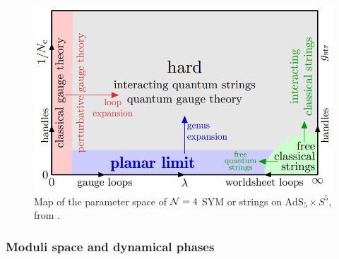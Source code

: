             \begin{figure}[H]
                \centering
                \includegraphics[scale=0.4]{Pictures/N4SYMparameterspace.png}
                \caption{Map of the parameter space of $\mathcal{N}=4$ SYM or strings on $\text{AdS}_5\times S^5$, from \cite{Beisert_2011}.}
            \end{figure}

        \subsubsection{Moduli space and dynamical phases}

